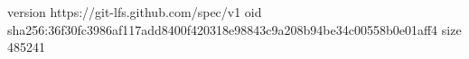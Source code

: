 version https://git-lfs.github.com/spec/v1
oid sha256:36f30fc3986af117add8400f420318e98843c9a208b94be34c00558b0e01aff4
size 485241
